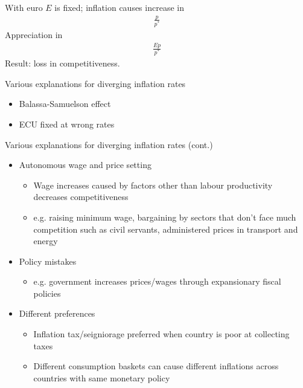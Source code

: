 \documentclass{beamer}
\begin{document}
\begin{frame}  
  With  euro $E$ is fixed; inflation causes increase in 
  \begin{align}
    \frac{p}{p^*}
  \end{align}
  \medskip
  Appreciation in 
  \begin{align}
    \frac{Ep}{p^*}
  \end{align}
  \medskip
  Result: loss in competitiveness. 
\end{frame}

\begin{frame}
 Various explanations for diverging inflation rates
 \begin{itemize}
   \item Balassa-Samuelson effect
   \item ECU fixed at wrong rates
 \end{itemize}
\end{frame}

\begin{frame}
  Various explanations for diverging inflation rates (cont.)
\begin{itemize}  
  \item Autonomous wage and price setting
  \begin{itemize}
    \item Wage increases caused by factors other than labour productivity decreases competitiveness
    \item e.g. raising minimum wage, bargaining by sectors that don't face much competition such as civil servants, administered prices in transport and energy
  \end{itemize}
  \item Policy mistakes
  \begin{itemize}
    \item e.g. government increases prices/wages through expansionary fiscal policies
  \end{itemize}  
  \item Different preferences
  \begin{itemize}
    \item Inflation tax/seigniorage preferred when country is poor at collecting taxes
    \item Different consumption baskets can cause different inflations across countries with same monetary policy
  \end{itemize}
\end{itemize}
\end{frame}
\end{document}
